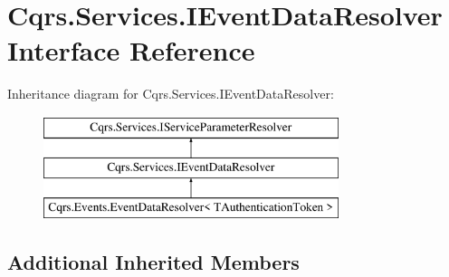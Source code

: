 \hypertarget{interfaceCqrs_1_1Services_1_1IEventDataResolver}{}\section{Cqrs.\+Services.\+I\+Event\+Data\+Resolver Interface Reference}
\label{interfaceCqrs_1_1Services_1_1IEventDataResolver}
Inheritance diagram for Cqrs.\+Services.\+I\+Event\+Data\+Resolver\+:\begin{figure}[H]
\begin{center}
\leavevmode
\includegraphics[height=3.000000cm]{interfaceCqrs_1_1Services_1_1IEventDataResolver}
\end{center}
\end{figure}
\subsection*{Additional Inherited Members}
